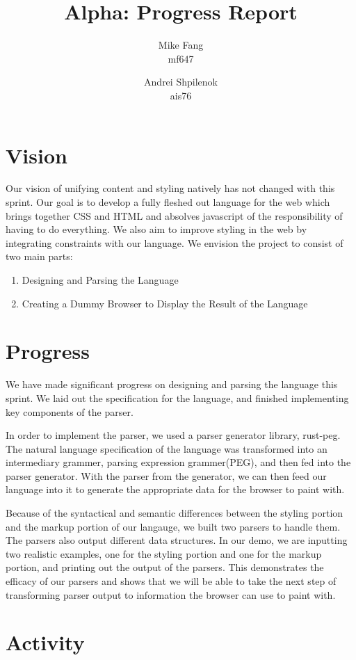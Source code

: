 \documentclass{article}
\title{Alpha: Progress Report}
\author{Mike Fang\\ mf647 \and Andrei Shpilenok\\ ais76}
\begin{document}
\maketitle
\section*{Vision}
Our vision of unifying content and styling natively has not
changed with this sprint. Our goal is to develop a fully fleshed out language
for the web which brings together CSS and HTML and absolves
javascript of the responsibility of having to do everything. We also aim to improve 
styling in the web by integrating constraints with our language. We envision the
project to consist of two main parts:
\begin{enumerate}
	\item Designing and Parsing the Language
	\item Creating a Dummy Browser to Display the Result of the Language
\end{enumerate}

\section*{Progress}

We have made significant progress on designing and parsing the language this sprint.
We laid out the specification for the language, and finished implementing 
key components of the parser.

In order to implement the parser, we used a parser generator library, rust-peg.
The natural language 
specification of the language was transformed into an
intermediary grammer, parsing expression grammer(PEG), and then fed into the parser
generator. With the parser from the generator, we can then feed our language into it
to generate the appropriate data for the browser to paint with.

Because of the syntactical and semantic differences between the styling portion and 
the markup portion of our langauge, we built two parsers to handle them. The parsers
also output different data structures. In our demo, we are inputting two realistic
examples, one for the styling portion and one for the markup portion,
and printing out the output of the parsers. This demonstrates the efficacy of
our parsers and shows that we will be able to take the next step of transforming
parser output to information the browser can use to paint with.

\section*{Activity}
\end{document}
